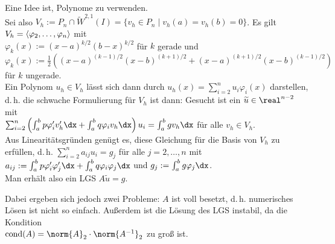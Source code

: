 \begin{Bem}
    Eine Idee ist, Polynome zu verwenden.\\
    Sei also $V_h := P_n \cap \widetilde{W}^{2,1}(I) =
    \{v_h \in P_n \;|\; v_h(a) = v_h(b) = 0\}$.
    Es gilt $V_h = \left\langle{\varphi_2, \dotsc, \varphi_n}\right\rangle$ mit\\
    $\varphi_k(x) := (x - a)^{k/2} (b - x)^{k/2}$ für $k$ gerade und\\
    $\varphi_k(x) := \frac{1}{2} ((x - a)^{(k-1)/2} (x - b)^{(k+1)/2} +
    (x - a)^{(k+1)/2} (x - b)^{(k-1)/2})$ für $k$ ungerade.\\
    Ein Polynom $u_h \in V_h$ lässt sich dann durch
    $u_h(x) = \sum_{i=2}^n u_i \varphi_i(x)$ darstellen, d.\,h.
    die schwache Formulierung für $V_h$ ist dann:
    Gesucht ist ein $\widetilde{u} \in \real^{n-2}$ mit\\
    $\sum_{i=2}^n
    \left(\int_a^b p\varphi_i'v_h'\dx + \int_a^b q\varphi_iv_h\dx\right)u_i =
    \int_a^b gv_h\dx$ für alle $v_h \in V_h$.\\
    Aus Linearitätsgründen genügt es, diese Gleichung für die Basis von $V_h$
    zu erfüllen, d.\,h.
    $\sum_{i=2}^n a_{ij} u_i = g_j$ für alle $j = 2, \dotsc, n$ mit
    $a_{ij} := \int_a^b p\varphi_i'\varphi_j'\dx +
    \int_a^b q\varphi_i\varphi_j\dx$ und
    $g_j := \int_a^b g\varphi_j\dx$.\\
    Man erhält also ein LGS $A\widetilde{u} = g$.

    Dabei ergeben sich jedoch zwei Probleme:
    $A$ ist voll besetzt, d.\,h. numerisches Lösen ist nicht so einfach.
    Außerdem ist die Lösung des LGS instabil, da die Kondition\\
    $\cond(A) = \norm{A}_2 \cdot \norm{A^{-1}}_2$ zu groß ist.
\end{Bem}

\linie
\pagebreak

